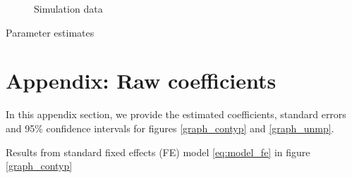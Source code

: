 \begin{figure}
    \caption{Simulation data}
    \label{graph_compare_models_simulation_paper}
\end{figure}

\begin{table}[!h]
    \caption{Parameter estimates}
    \centering
    \resizebox{\textwidth}{!}{}
    \label{table_compare_models_simulation_paper}
\end{table}


\clearpage
\section{Appendix: Raw coefficients}\label{appendix:coefficients}
\setcounter{table}{0}
\setcounter{figure}{0}
\renewcommand*\thetable{\Alph{section}.\arabic{table}}
\renewcommand*\thefigure{\Alph{section}.\arabic{figure}}
\renewcommand{\theHfigure}{\Alph{section}.\arabic{table}}
\renewcommand{\theHtable}{\Alph{section}.\arabic{figure}}

In this appendix section, we provide the estimated coefficients, standard errors and 95\% confidence intervals for figures \ref{graph_contyp} and \ref{graph_unmp}.

\begin{table}[!h]
    \caption{Results from standard fixed effects (FE) model \ref{eq:model_fe} in figure \ref{graph_contyp}}
    \centering
    
    \label{beta_coef_contyp_fe}
\end{table}

